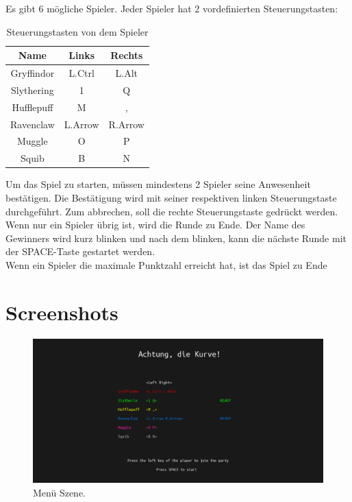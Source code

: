 \documentclass[doktyp=studarbeit]{TUBAFarbeiten}
\begin{document}
Es gibt 6 mögliche Spieler. Jeder Spieler hat 2 vordefinierten Steuerungstasten:

\begin{table}
    \centering
    \begin{tabular}{ |c|c|c| }
        \hline
        Name & Links & Rechts \\
        \hline
        Gryffindor & L.Ctrl  & L.Alt \\
        Slythering & 1       & Q \\
        Hufflepuff & M       & , \\
        Ravenclaw  & L.Arrow & R.Arrow \\
        Muggle     & O       & P \\
        Squib      & B       & N \\
        \hline
    \end{tabular}
    \caption{Steuerungstasten von dem Spieler}
\end{table}

\FloatBarrier
Um das Spiel zu starten, müssen mindestens 2 Spieler seine Anwesenheit 
bestätigen. Die Bestätigung wird mit seiner respektiven linken
Steuerungstaste durchgeführt. Zum abbrechen, soll die rechte Steuerungstaste 
gedrückt werden. \\

Wenn nur ein Spieler übrig ist, wird die Runde zu Ende. Der Name des Gewinners
wird kurz blinken und nach dem blinken, kann die nächste Runde mit der 
SPACE-Taste gestartet werden. \\

Wenn ein Spieler die maximale Punktzahl erreicht hat, ist das Spiel zu Ende

\printbibliography[heading=bibintoc]

\newpage
\appendix
\section{Screenshots}
\begin{figure}[!htb]
	\centering
	\includegraphics[width=0.9\linewidth]{1.png}
	\caption{Menü Szene.}
	\label{fig:menu}
\end{figure}
\end{document}
